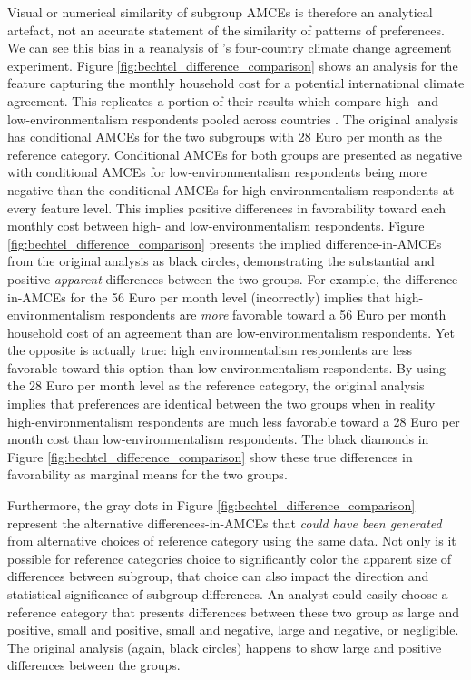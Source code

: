 \documentclass[a4paper,12pt]{article}\usepackage[]{graphicx}\usepackage[]{color}
\begin{document}
Visual or numerical similarity of subgroup AMCEs is therefore an analytical artefact, not an accurate statement of the similarity of patterns of preferences. We can see this bias in a reanalysis of \citeauthor{BechtelScheve2013}'s four-country climate change agreement experiment. Figure \ref{fig:bechtel_difference_comparison} shows an analysis for the feature capturing the monthly household cost for a potential international climate agreement. This replicates a portion of their results which compare high- and low-environmentalism respondents pooled across countries \citep[13767 figure 4]{BechtelScheve2013}. The original analysis has conditional AMCEs for the two subgroups with 28 Euro per month as the reference category. Conditional AMCEs for both groups are presented as negative with conditional AMCEs for low-environmentalism respondents being more negative than the conditional AMCEs for high-environmentalism respondents at every feature level. This implies positive differences in favorability toward each monthly cost between high- and low-environmentalism respondents. Figure \ref{fig:bechtel_difference_comparison} presents the implied difference-in-AMCEs from the original analysis as black circles, demonstrating the substantial and positive \textit{apparent} differences between the two groups. For example, the difference-in-AMCEs for the 56 Euro per month level (incorrectly) implies that high-environmentalism respondents are \textit{more} favorable toward a 56 Euro per month household cost of an agreement than are low-environmentalism respondents. Yet the opposite is actually true: high environmentalism respondents are less favorable toward this option than low environmentalism respondents. By using the 28 Euro per month level as the reference category, the original analysis implies that preferences are identical between the two groups when in reality high-environmentalism respondents are much less favorable toward a 28 Euro per month cost than low-environmentalism respondents. The black diamonds in Figure \ref{fig:bechtel_difference_comparison} show these true differences in favorability as marginal means for the two groups.

Furthermore, the gray dots in Figure \ref{fig:bechtel_difference_comparison} represent the alternative differences-in-AMCEs that \textit{could have been generated} from alternative choices of reference category using the same data. Not only is it possible for reference categories choice to significantly color the apparent size of differences between subgroup, that choice can also impact the direction and statistical significance of subgroup differences. An analyst could easily choose a reference category that presents differences between these two group as large and positive, small and positive, small and negative, large and negative, or negligible. The original analysis (again, black circles) happens to show large and positive differences between the groups.
\end{document}
